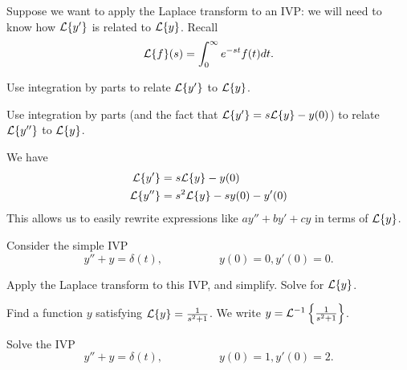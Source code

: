 \begin{applicationActivities}
\begin{activity}{10}
Suppose we want to apply the Laplace transform to an IVP: we will need to know how \(\mathcal{L}\{y'\}\) is related to \(\mathcal{L}\{y\}\).  Recall
\[\mathcal{L}\{f\}(s)=\int _0 ^\infty e^{-st}f(t)dt.\]
\vfill
\begin{subactivity}
Use integration by parts to relate \(\mathcal{L}\{y'\}\) to \(\mathcal{L}\{y\}\).
\end{subactivity}
\begin{subactivity}
Use integration by parts (and the fact that \(\mathcal{L}\{y'\}=s\mathcal{L}\{y\}-y(0)\)) to relate \(\mathcal{L}\{y''\}\) to \(\mathcal{L}\{y\}\).
\end{subactivity}
\end{activity}

\begin{observation}
We have
\begin{align*}
\mathcal{L}\{y'\} &= s\mathcal{L}\{y\}-y(0) \\
\mathcal{L}\{y''\} &= s^2\mathcal{L}\{y\}-sy(0)-y'(0) 
\end{align*}
\vfill
This allows us to easily rewrite expressions like \(ay''+by'+cy\) in terms of \(\mathcal{L}\{y\}\).
\end{observation}

\begin{activity}{10}
Consider the simple IVP
\[y''+y=\delta(t),\hspace{5em} y(0)=0, y'(0)=0.\]
\begin{subactivity}
Apply the Laplace transform to this IVP, and simplify.  Solve for \(\mathcal{L}\{y\}\).
\end{subactivity}
\begin{subactivity}
Find a function \(y\) satisfying \(\mathcal{L}\{y\}=\frac{1}{s^2+1}\).  We write \(y=\mathcal{L}^{-1}\left\{\frac{1}{s^2+1}\right\}\).
\end{subactivity}
\end{activity}

\begin{activity}{15}
Solve the IVP
\[y''+y=\delta(t),\hspace{5em} y(0)=1, y'(0)=2.\]
\end{activity}



\end{applicationActivities}
